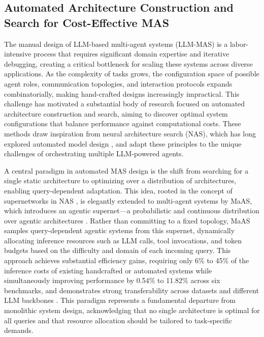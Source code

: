 \documentclass[11pt]{article}
\begin{document}
\subsection{Automated Architecture Construction and Search for Cost-Effective MAS}

The manual design of LLM-based multi-agent systems (LLM-MAS) is a labor-intensive process that requires significant domain expertise and iterative debugging, creating a critical bottleneck for scaling these systems across diverse applications. As the complexity of tasks grows, the configuration space of possible agent roles, communication topologies, and interaction protocols expands combinatorially, making hand-crafted designs increasingly impractical. This challenge has motivated a substantial body of research focused on automated architecture construction and search, aiming to discover optimal system configurations that balance performance against computational costs. These methods draw inspiration from neural architecture search (NAS), which has long explored automated model design \cite{ref263,ref264,ref265}, and adapt these principles to the unique challenges of orchestrating multiple LLM-powered agents.

A central paradigm in automated MAS design is the shift from searching for a single static architecture to optimizing over a distribution of architectures, enabling query-dependent adaptation. This idea, rooted in the concept of supernetworks in NAS \cite{ref266,ref267,ref268}, is elegantly extended to multi-agent systems by MaAS, which introduces an agentic supernet---a probabilistic and continuous distribution over agentic architectures \cite{ref269}. Rather than committing to a fixed topology, MaAS samples query-dependent agentic systems from this supernet, dynamically allocating inference resources such as LLM calls, tool invocations, and token budgets based on the difficulty and domain of each incoming query. This approach achieves substantial efficiency gains, requiring only 6\% to 45\% of the inference costs of existing handcrafted or automated systems while simultaneously improving performance by 0.54\% to 11.82\% across six benchmarks, and demonstrates strong transferability across datasets and different LLM backbones \cite{ref269}. This paradigm represents a fundamental departure from monolithic system design, acknowledging that no single architecture is optimal for all queries and that resource allocation should be tailored to task-specific demands.
\end{document}
